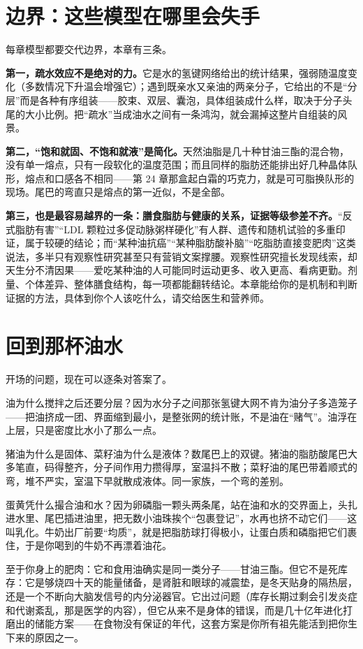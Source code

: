 \section{边界：这些模型在哪里会失手}

每章模型都要交代边界，本章有三条。

\textbf{第一，疏水效应不是绝对的力。}它是水的氢键网络给出的统计结果，强弱随温度变化（多数情况下升温会增强它）；遇到既亲水又亲油的两亲分子，它给出的不是“分层”而是各种有序组装——胶束、双层、囊泡，具体组装成什么样，取决于分子头尾的大小比例。把“疏水”当成油水之间有一条鸿沟，就会漏掉这整片自组装的风景。

\textbf{第二，“饱和就固、不饱和就液”是简化。}天然油脂是几十种甘油三酯的混合物，没有单一熔点，只有一段软化的温度范围；而且同样的脂肪还能排出好几种晶体队形，熔点和口感各不相同——第 24 章那盒起白霜的巧克力，就是可可脂换队形的现场。尾巴的弯直只是熔点的第一近似，不是全部。

\textbf{第三，也是最容易越界的一条：膳食脂肪与健康的关系，证据等级参差不齐。}“反式脂肪有害”“LDL 颗粒过多促动脉粥样硬化”有人群、遗传和随机试验的多重印证，属于较硬的结论；而“某种油抗癌”“某种脂肪酸补脑”“吃脂肪直接变肥肉”这类说法，多半只有观察性研究甚至只有营销文案撑腰。观察性研究擅长发现线索，却天生分不清因果——爱吃某种油的人可能同时运动更多、收入更高、看病更勤。剂量、个体差异、整体膳食结构，每一项都能翻转结论。本章能给你的是机制和判断证据的方法，具体到你个人该吃什么，请交给医生和营养师。

\section{回到那杯油水}

开场的问题，现在可以逐条对答案了。

油为什么搅拌之后还要分层？因为水分子之间那张氢键大网不肯为油分子多造笼子——把油挤成一团、界面缩到最小，是整张网的统计账，不是油在“赌气”。油浮在上层，只是密度比水小了那么一点。

猪油为什么是固体、菜籽油为什么是液体？数尾巴上的双键。猪油的脂肪酸尾巴大多笔直，码得整齐，分子间作用力攒得厚，室温抖不散；菜籽油的尾巴带着顺式的弯，堆不严实，室温下早就散成液体。同一家族，一个弯的差别。

蛋黄凭什么撮合油和水？因为卵磷脂一颗头两条尾，站在油和水的交界面上，头扎进水里、尾巴插进油里，把无数小油珠挨个“包裹登记”，水再也挤不动它们——这叫乳化。牛奶出厂前要“均质”，就是把脂肪球打得极小，让蛋白质和磷脂把它们裹住，于是你喝到的牛奶不再漂着油花。

至于你身上的肥肉：它和食用油确实是同一类分子——甘油三酯。但它不是死库存：它是够烧四十天的能量储备，是肾脏和眼球的减震垫，是冬天贴身的隔热层，还是一个不断向大脑发信号的内分泌器官。它出过问题（库存长期过剩会引发炎症和代谢紊乱，那是医学的内容），但它从来不是身体的错误，而是几十亿年进化打磨出的储能方案——在食物没有保证的年代，这套方案是你所有祖先能活到把你生下来的原因之一。


